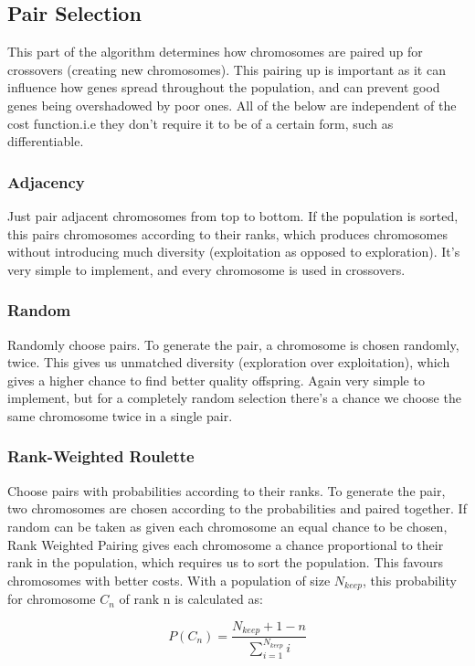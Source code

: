 \subsection{Pair Selection}
This part of the algorithm determines how chromosomes are paired up for crossovers (creating new chromosomes). This pairing up is important as it can influence how genes spread throughout the population, and can prevent good genes being overshadowed by poor ones. All of the below are independent of the cost function.i.e they don't require it to be of a certain form, such as differentiable. 

\subsubsection{Adjacency}
Just pair adjacent chromosomes from top to bottom. If the population is sorted, this pairs chromosomes according to their ranks, which produces chromosomes without introducing much diversity (exploitation as opposed to exploration). It's very simple to implement, and every chromosome is used in crossovers. 

\subsubsection{Random}
Randomly choose pairs. To generate the pair, a chromosome is chosen randomly, twice. This gives us unmatched diversity (exploration over exploitation), which gives a higher chance to find better quality offspring. Again very simple to implement, but for a completely random selection there's a chance we choose the same chromosome twice in a single pair.

\subsubsection{Rank-Weighted Roulette}
Choose pairs with probabilities according to their ranks.  To generate the pair, two chromosomes are chosen according to the probabilities and paired together. If random can be taken as given each chromosome an equal chance to be chosen, Rank Weighted Pairing gives each chromosome a chance proportional to their rank in the population, which requires us to sort the population. This favours chromosomes with better costs. With a population of size $N_{keep}$, this probability for chromosome $C_n$ of rank n is calculated as:

\begin{equation}
    P(C_n) = \frac{N_{keep} + 1 - n}{\sum_{i=1}^{N_{keep}} i}
\end{equation}


